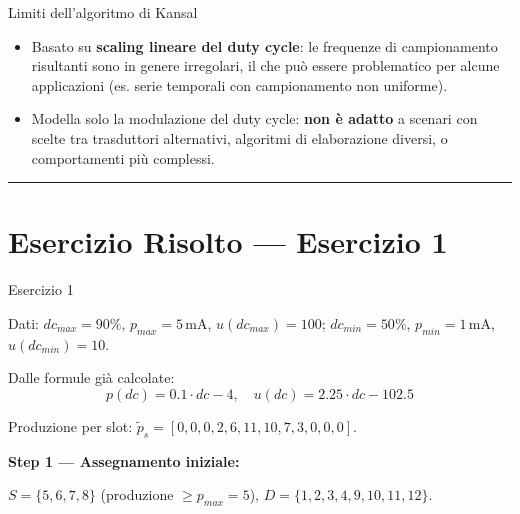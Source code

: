 \documentclass[
  italian,
  openany]{book}
\providecommand{\tightlist}{%
  \setlength{\itemsep}{0pt}\setlength{\parskip}{0pt}}
\begin{document}
\begin{calloutwarning}{Limiti dell’algoritmo di Kansal}

\begin{itemize}
\tightlist
\item
  Basato su \textbf{scaling lineare del duty cycle}: le frequenze di
  campionamento risultanti sono in genere irregolari, il che può essere
  problematico per alcune applicazioni (es. serie temporali con
  campionamento non uniforme).
\item
  Modella solo la modulazione del duty cycle: \textbf{non è adatto} a
  scenari con scelte tra trasduttori alternativi, algoritmi di
  elaborazione diversi, o comportamenti più complessi.
\end{itemize}

\end{calloutwarning}

\begin{center}\rule{0.5\linewidth}{0.5pt}\end{center}

\section{Esercizio Risolto --- Esercizio
1}\label{esercizio-risolto-esercizio-1}

\begin{callouttip}{Esercizio 1}

Dati: \(dc_{max}=90\%\), \(p_{max}=5\,\text{mA}\), \(u(dc_{max})=100\);
\(dc_{min}=50\%\), \(p_{min}=1\,\text{mA}\), \(u(dc_{min})=10\).

Dalle formule già calcolate:
\[p(dc) = 0.1 \cdot dc - 4, \quad u(dc) = 2.25 \cdot dc - 102.5\]

Produzione per slot:
\(\tilde{p}_s = [0, 0, 0, 2, 6, 11, 10, 7, 3, 0, 0, 0]\).

\end{callouttip}

\textbf{Step 1 --- Assegnamento iniziale:}

\(S = \{5, 6, 7, 8\}\) (produzione \(\geq p_{max} = 5\)),
\(D = \{1,2,3,4,9,10,11,12\}\).
\end{document}
